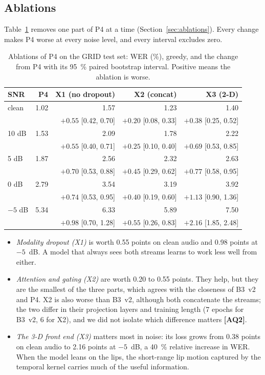 \subsection{Ablations}
Table~\ref{tab:ablation} removes one part of P4 at a time (Section~\ref{sec:ablations}). Every
change makes P4 worse at every noise level, and every interval excludes zero.

\begin{table}[t]
\caption{Ablations of P4 on the GRID test set: WER (\%), greedy, and the change from P4 with its
95~\% paired bootstrap interval. Positive means the ablation is worse.}
\label{tab:ablation}
\centering
\setlength{\tabcolsep}{1.8pt}
\begin{tabular}{lrrrr}
\toprule
SNR & P4 & X1 (no dropout) & X2 (concat) & X3 (2-D) \\
\midrule
clean   & 1.02 & 1.57 & 1.23 & 1.40 \\
        &      & $+0.55$ [0.42, 0.70] & $+0.20$ [0.08, 0.33] & $+0.38$ [0.25, 0.52] \\
10 dB   & 1.53 & 2.09 & 1.78 & 2.22 \\
        &      & $+0.55$ [0.40, 0.71] & $+0.25$ [0.10, 0.40] & $+0.69$ [0.53, 0.85] \\
5 dB    & 1.87 & 2.56 & 2.32 & 2.63 \\
        &      & $+0.70$ [0.53, 0.88] & $+0.45$ [0.29, 0.62] & $+0.77$ [0.58, 0.95] \\
0 dB    & 2.79 & 3.54 & 3.19 & 3.92 \\
        &      & $+0.74$ [0.53, 0.95] & $+0.40$ [0.19, 0.60] & $+1.13$ [0.90, 1.36] \\
$-5$ dB & 5.34 & 6.33 & 5.89 & 7.50 \\
        &      & $+0.98$ [0.70, 1.28] & $+0.55$ [0.26, 0.83] & $+2.16$ [1.85, 2.48] \\
\bottomrule
\end{tabular}
\end{table}

\begin{itemize}
\item \textit{Modality dropout (X1)} is worth 0.55 points on clean audio and 0.98 points at
$-5$~dB. A model that always sees both streams learns to work less well from either.
\item \textit{Attention and gating (X2)} are worth 0.20 to 0.55 points. They help, but they are the
smallest of the three parts, which agrees with the closeness of B3~v2 and P4. X2 is also worse
than B3~v2, although both concatenate the streams; the two differ in their projection layers and
training length (7 epochs for B3~v2, 6 for X2), and we did not isolate which difference matters
\textbf{[AQ2]}.
\item \textit{The 3-D front end (X3)} matters most in noise: its loss grows from 0.38 points on
clean audio to 2.16 points at $-5$~dB, a 40~\% relative increase in WER. When the model leans on
the lips, the short-range lip motion captured by the temporal kernel carries much of the useful
information.
\end{itemize}

